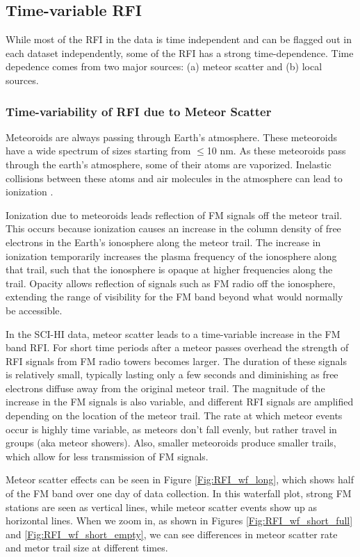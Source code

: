 \subsection{Time-variable RFI}

While most of the RFI in the data is time independent and can be flagged out in each dataset independently, some of the RFI has a strong time-dependence. Time depedence comes from two major sources: (a) meteor scatter and (b) local sources. 

\subsubsection{Time-variability of RFI due to Meteor Scatter}

Meteoroids are always passing through Earth's atmosphere. These meteoroids have a wide spectrum of sizes starting from $\leq$10 nm. As these meteoroids pass through the earth's atmosphere, some of their atoms are vaporized. Inelastic collisions between these atoms and air molecules in the atmosphere can lead to ionization \cite{meteor_review}. 

Ionization due to meteoroids leads reflection of FM signals off the meteor trail. This occurs because ionization causes an increase in the column density of free electrons in the Earth's ionosphere along the meteor trail. The increase in ionization temporarily increases the plasma frequency of the ionosphere along that trail, such that the ionosphere is opaque at higher frequencies along the trail. Opacity allows reflection of signals such as FM radio off the ionosphere, extending the range of visibility for the FM band beyond what would normally be accessible.

In the SCI-HI data, meteor scatter leads to a time-variable increase in the FM band RFI. For short time periods after a meteor passes overhead the strength of RFI signals from FM radio towers becomes larger. The duration of these signals is relatively small, typically lasting only a few seconds and diminishing as free electrons diffuse away from the original meteor trail. The magnitude of the increase in the FM signals is also variable, and different RFI signals are amplified depending on the location of the meteor trail. The rate at which meteor events occur is highly time variable, as meteors don't fall evenly, but rather travel in groups (aka meteor showers). Also, smaller meteoroids produce smaller trails, which allow for less transmission of FM signals.

Meteor scatter effects can be seen in Figure \ref{Fig:RFI_wf_long}, which shows half of the FM band over one day of data collection. In this waterfall plot, strong FM stations are seen as vertical lines, while meteor scatter events show up as horizontal lines. When we zoom in, as shown in Figures \ref{Fig:RFI_wf_short_full} and \ref{Fig:RFI_wf_short_empty}, we can see differences in meteor scatter rate and metor trail size at different times.

